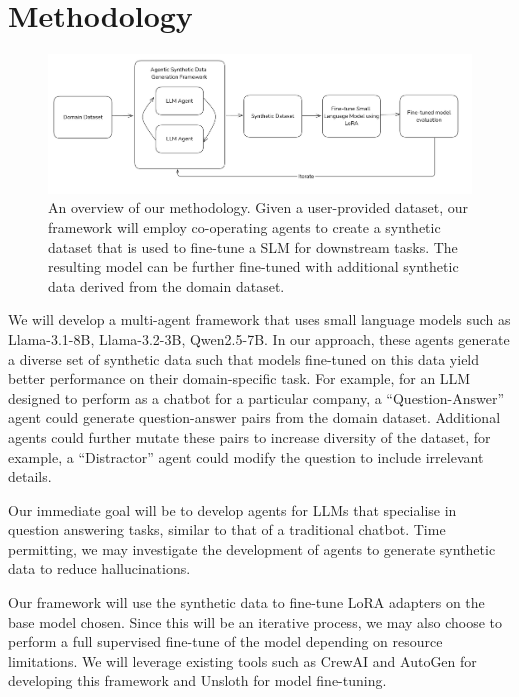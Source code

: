 \section{Methodology}

\begin{figure}[h]
  \centering
  \includegraphics[width=1\textwidth]{methodology.png}
  \caption{An overview of our methodology. Given a user-provided dataset, our
framework will employ co-operating agents to create a synthetic dataset that is
used to fine-tune a SLM for downstream tasks. The resulting model can be further
fine-tuned with additional synthetic data derived from the domain dataset.}
\end{figure}

We will develop a multi-agent framework that uses small language models such as
Llama-3.1-8B, Llama-3.2-3B, Qwen2.5-7B. In our approach, these agents generate a
diverse set of synthetic data such that models fine-tuned on this data yield
better performance on their domain-specific task. For example, for an LLM
designed to perform as a chatbot for a particular company, a ``Question-Answer''
agent could generate question-answer pairs from the domain dataset. Additional
agents could further mutate these pairs to increase diversity of the dataset,
for example, a ``Distractor'' agent could modify the question to include
irrelevant details.

Our immediate goal will be to develop agents for LLMs that specialise in
question answering tasks, similar to that of a traditional chatbot. Time
permitting, we may investigate the development of agents to generate synthetic
data to reduce hallucinations.

Our framework will use the synthetic data to fine-tune LoRA adapters on the base
model chosen. Since this will be an iterative process, we may also choose to
perform a full supervised fine-tune of the model depending on resource
limitations. We will leverage existing tools such as CrewAI \citep{crewai} and AutoGen \citep{wu2023autogenenablingnextgenllm} 
for developing this framework and Unsloth \citep{unslothai} for model fine-tuning. 


